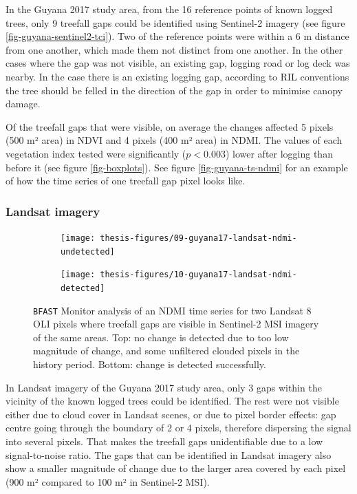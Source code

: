 \documentclass[a4paper,12pt]{scrbook}
\begin{document}
In the Guyana 2017 study area, from the 16 reference points of known logged trees, only 9 treefall gaps could be identified using Sentinel-2 imagery (see figure \ref{fig-guyana-sentinel2-tci}). Two of the reference points were within a 6 m distance from one another, which made them not distinct from one another. In the other cases where the gap was not visible, an existing gap, logging road or log deck was nearby. In the case there is an existing logging gap, according to \ac{RIL} conventions the tree should be felled in the direction of the gap in order to minimise canopy damage.

Of the treefall gaps that were visible, on average the changes affected 5 pixels (500 m² area) in NDVI and 4 pixels (400 m² area) in NDMI. The values of each vegetation index tested were significantly ($ p < 0.003 $) lower after logging than before it (see figure \ref{fig-boxplots}). See figure \ref{fig-guyana-ts-ndmi} for an example of how the time series of one treefall gap pixel looks like.

\subsubsection{Landsat imagery}

\begin{figure}
  \begin{subfigure}{\textwidth}
    \centering
    \texttt{[image: thesis-figures/09-guyana17-landsat-ndmi-undetected]}
  \end{subfigure}
  \begin{subfigure}{\textwidth}
    \centering
    \texttt{[image: thesis-figures/10-guyana17-landsat-ndmi-detected]}
  \end{subfigure}
  
  \caption{\texttt{BFAST} Monitor analysis of an \ac{NDMI} time series for two Landsat 8 \ac{OLI} pixels where treefall gaps are visible in Sentinel-2 \ac{MSI} imagery of the same areas. Top: no change is detected due to too low magnitude of change, and some unfiltered clouded pixels in the history period. Bottom: change is detected successfully.}
  \label{fig-guyana17-landsat-ndmi}
\end{figure}

In Landsat imagery of the Guyana 2017 study area, only 3 gaps within the vicinity of the known logged trees could be identified. The rest were not visible either due to cloud cover in Landsat scenes, or due to pixel border effects: gap centre going through the boundary of 2 or 4 pixels, therefore dispersing the signal into several pixels. That makes the treefall gaps unidentifiable due to a low signal-to-noise ratio. The gaps that can be identified in Landsat imagery also show a smaller magnitude of change due to the larger area covered by each pixel (900 m² compared to 100 m² in Sentinel-2 \ac{MSI}).
\end{document}
